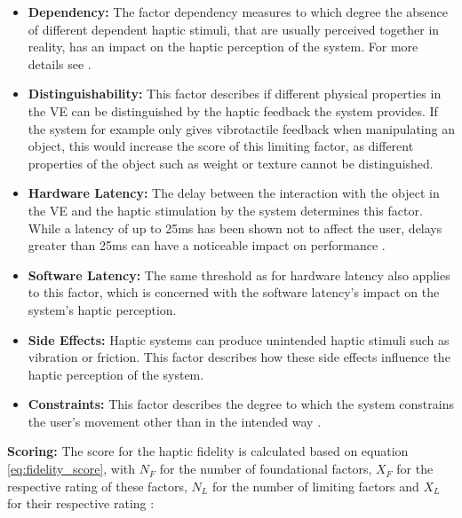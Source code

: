\begin{itemize}
    \item \textbf{Dependency:}
    The factor dependency measures to which degree the absence of different dependent haptic stimuli, that are usually perceived together in reality, has an impact on the haptic perception of the system. For more details see \cite{Muender2022HapticReality}.
    
    \item \textbf{Distinguishability:}
    This factor describes if different physical properties in the VE can be distinguished by the haptic feedback the system provides. If the system for example only gives vibrotactile feedback when manipulating an object, this would increase the score of this limiting factor, as different properties of the object such as weight or texture cannot be distinguished. 

    \item \textbf{Hardware Latency:}
    The delay between the interaction with the object in the VE and the haptic stimulation by the system determines this factor. While a latency of up to 25ms has been shown not to affect the user, delays greater than 25ms can have a noticeable impact on performance \cite{Muender2022HapticReality}.
    
    \item \textbf{Software Latency:}
    The same threshold as for hardware latency also applies to this factor, which is concerned with the software latency's impact on the system's haptic perception.

    \item \textbf{Side Effects:}
    Haptic systems can produce unintended haptic stimuli such as vibration or friction. This factor describes how these side effects influence the haptic perception of the system. 

    \item \textbf{Constraints:}
    This factor describes the degree to which the system constrains the user's movement other than in the intended way \cite{Muender2022HapticReality}.
    
\end{itemize}

\textbf{Scoring:}
The score for the haptic fidelity is calculated based on equation \ref{eq:fidelity_score}, with $N_F$ for the number of foundational factors, $X_F$ for the respective rating of these factors, $N_L$ for the number of limiting factors and $X_L$ for their respective rating \cite{Muender2022HapticReality}:

